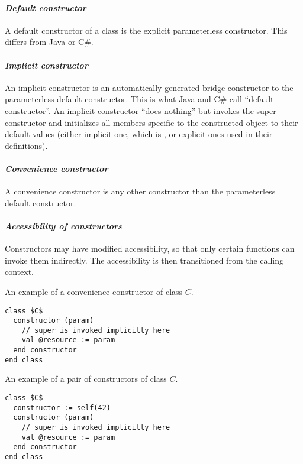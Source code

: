 
\paragraph{\em Default constructor}
A default constructor of a class is the explicit parameterless constructor. This differs from Java or C\#. 

\paragraph{\em Implicit constructor}
An implicit constructor is an automatically generated bridge constructor to the parameterless default constructor. This is what Java and C\# call ``default constructor''. An implicit constructor ``does nothing'' but invokes the super-constructor and initializes all members specific to the constructed object to their default values (either implicit one, which is , or explicit ones used in their definitions). 

\paragraph{\em Convenience constructor}
A convenience constructor is any other constructor than the parameterless default constructor. 

\paragraph{\em Accessibility of constructors}
Constructors may have modified accessibility, so that only certain functions can invoke them indirectly. The accessibility is then transitioned from the calling context. 

\example An example of a convenience constructor of class $C$.
\begin{lstlisting}
class $C$
  constructor (param)
    // super is invoked implicitly here
    val @resource := param
  end constructor
end class
\end{lstlisting}

\example An example of a pair of constructors of class $C$. 
\begin{lstlisting}
class $C$
  constructor := self(42)
  constructor (param)
    // super is invoked implicitly here
    val @resource := param
  end constructor
end class
\end{lstlisting}

